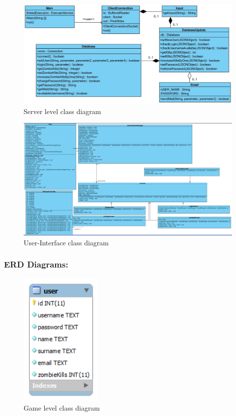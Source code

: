 \documentclass[letterpaper]{article}
\begin{document}
					\begin{figure}[hp!]
					\centering
					\includegraphics[width=180mm]{UML_Diagram/Class/Server_Classes.jpg}
					\caption{Server level class diagram}
					\label{overflow}
					\end{figure}
					
					\begin{figure}[hp!]
					\centering
					\includegraphics[width=180mm]{UML_Diagram/Class/GUI_Classes.jpg}
					\caption{User-Interface class diagram}
					\label{overflow}
					\end{figure}
					
				\vspace{0.2in}	
				\subsubsection*{ERD Diagrams:}
				\vspace{0.1in}
				
					\begin{figure}[H]
					\centering
					\includegraphics[width=40mm]{UML_Diagram/ERD/Database.png}
					\caption{Game level class diagram}
					\label{overflow}
					\end{figure}
					
\end{document}

